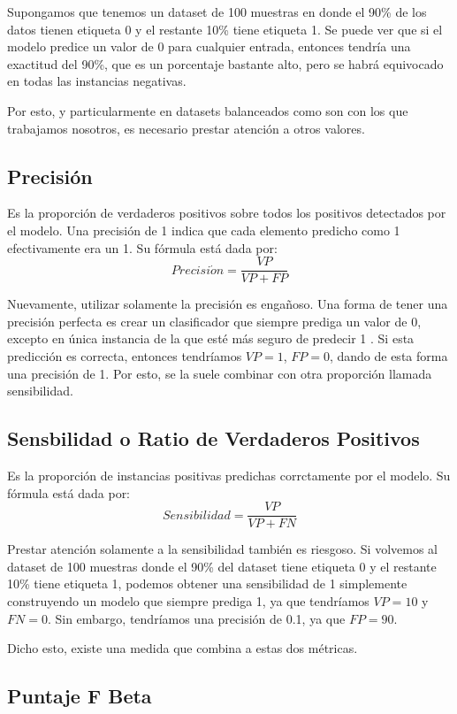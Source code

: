 \documentclass[../../main.tex]{subfiles}
\begin{document}
Supongamos que tenemos un dataset de 100 muestras en donde el 90\% de los datos tienen
etiqueta 0 y el restante 10\% tiene etiqueta 1. Se puede ver que si el modelo predice un
valor de 0 para cualquier entrada, entonces tendría una exactitud del 90\%, que es un
porcentaje bastante alto, pero se habrá equivocado en todas las instancias negativas.

Por esto, y particularmente en datasets balanceados como son con los que trabajamos
nosotros, es necesario prestar atención a otros valores.

\subsection{Precisión}
Es la proporción de verdaderos positivos sobre todos los positivos detectados por el
modelo. Una precisión de 1 indica que cada elemento predicho como 1 efectivamente
era un 1. Su fórmula está dada por:
\[
    Precisi\acute{o}n = \frac{VP}{VP + FP}
\]

Nuevamente, utilizar solamente la precisión es engañoso. Una forma de tener una precisión
perfecta es crear un clasificador que siempre prediga un valor de 0, excepto en única
instancia de la que esté más seguro de predecir 1 \cite{hands-on-ML-sklearn-tf}. Si esta
predicción es correcta, entonces tendríamos \(VP=1\), \(FP=0\), dando de esta forma una
precisión de 1. Por esto, se la suele combinar con otra proporción llamada sensibilidad.

\subsection{Sensbilidad o Ratio de Verdaderos Positivos}
Es la proporción de instancias positivas predichas corrctamente por el modelo. Su
fórmula está dada por:
\[
    Sensibilidad = \frac{VP}{VP + FN}
\]

Prestar atención solamente a la sensibilidad también es riesgoso. Si volvemos al dataset
de 100 muestras donde el 90\% del dataset tiene etiqueta 0 y el restante 10\% tiene
etiqueta 1, podemos obtener una sensibilidad de 1 simplemente construyendo un modelo que
siempre prediga 1, ya que tendríamos \(VP=10\) y \(FN=0\). Sin embargo, tendríamos
una precisión de 0.1, ya que \(FP=90\).

Dicho esto, existe una medida que combina a estas dos métricas.

\subsection{Puntaje F Beta}
\end{document}
